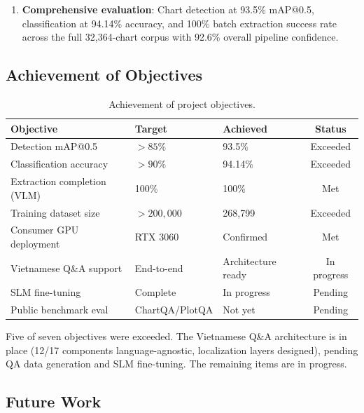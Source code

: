 \begin{enumerate}
    \item \textbf{Comprehensive evaluation}: Chart detection at 93.5\% mAP@0.5,
          classification at 94.14\% accuracy, and 100\% batch extraction success rate
          across the full 32,364-chart corpus with 92.6\% overall pipeline confidence.
\end{enumerate}

\subsection{Achievement of Objectives}

\begin{table}[htbp]
\centering
\caption{Achievement of project objectives.}
\label{tab:objectives}
\begin{tabular}{@{}lllc@{}}
\toprule
\textbf{Objective} & \textbf{Target} & \textbf{Achieved} & \textbf{Status} \\
\midrule
Detection mAP@0.5 & $>85\%$ & 93.5\% & Exceeded \\
Classification accuracy & $>90\%$ & 94.14\% & Exceeded \\
Extraction completion (VLM) & 100\% & 100\% & Met \\
Training dataset size & $>200{,}000$ & 268,799 & Exceeded \\
Consumer GPU deployment & RTX 3060 & Confirmed & Met \\
Vietnamese Q\&A support & End-to-end & Architecture ready & In progress \\
SLM fine-tuning & Complete & In progress & Pending \\
Public benchmark eval & ChartQA/PlotQA & Not yet & Pending \\
\bottomrule
\end{tabular}
\end{table}

Five of seven objectives were exceeded. The Vietnamese Q\&A architecture is in place
(12/17 components language-agnostic, localization layers designed), pending QA data
generation and SLM fine-tuning. The remaining items are in progress.

\subsection{Future Work}

